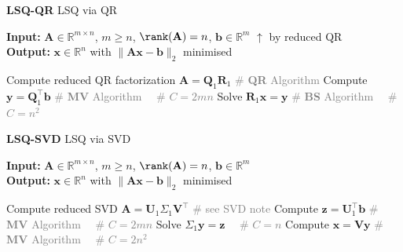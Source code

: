 \documentclass{note}
\newcommand{\codealg}[1]{\textcolor{gray}{\quad \# \textbf{#1} Algorithm}}
\begin{document}
\vspace{-27pt}

\begin{multicols}{3}

\begin{algorithm}[H]
\tiny
\caption*{\textbf{LSQ-QR} LSQ via QR \ \ }
\textbf{Input:} $\mathbf{A} \in \mathbb{R}^{m \times n}$, $m \geq n$, $\rank(\mathbf{A}) = n$, $\mathbf{b} \in \mathbb{R}^m$ \qquad $\uparrow$ by reduced QR \\
\textbf{Output:} $\mathbf{x} \in \mathbb{R}^n$ with $\|\mathbf{Ax} - \mathbf{b}\|_2$ minimised
\begin{algorithmic}[1]
  \State Compute reduced QR factorization $\mathbf{A} = \mathbf{Q}_1\mathbf{R}_1$ \codealg{QR}
  \State Compute $\mathbf{y} = \mathbf{Q}_1^{\top} \mathbf{b}$ \codealg{MV} \ \ \textcolor{gray}{\# $C=2mn$}
  \State Solve $\mathbf{R}_1 \mathbf{x} = \mathbf{y}$ \codealg{BS} \ \ \textcolor{gray}{\# $C=n^2$}
\end{algorithmic}
\end{algorithm}

\begin{algorithm}[H]
\tiny
\caption*{\textbf{LSQ-SVD} LSQ via SVD}
\textbf{Input:} $\mathbf{A} \in \mathbb{R}^{m \times n}$, $m \geq n$, $\rank(\mathbf{A}) = n$, $\mathbf{b} \in \mathbb{R}^m$ \\
\textbf{Output:} $\mathbf{x} \in \mathbb{R}^n$ with $\|\mathbf{Ax} - \mathbf{b}\|_2$ minimised
\begin{algorithmic}[1]
  \State Compute reduced SVD $\mathbf{A} = \mathbf{U}_1 \Sigma_1 \mathbf{V}^\top$ \quad \textcolor{gray}{\# see SVD note}
  \State Compute $\mathbf{z} = \mathbf{U}_1^\top \mathbf{b}$ \codealg{MV} \ \ \textcolor{gray}{\# $C=2mn$}
  \State Solve $\Sigma_1 \mathbf{y} = \mathbf{z}$ \ \ \textcolor{gray}{\# $C=n$}
  \State Compute $\mathbf{x} = \mathbf{V} \mathbf{y}$ \codealg{MV} \ \ \textcolor{gray}{\# $C=2n^2$}
\end{algorithmic}
\end{algorithm}


\end{multicols}
\end{document}
